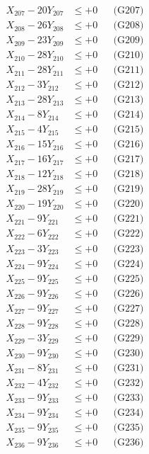 \documentclass[a4paper,10pt]{article}
\begin{document}
{\begin{align}
X_{207} - 20Y_{207} &\leq +0 && \text{(G207)} \\
X_{208} - 26Y_{208} &\leq +0 && \text{(G208)} \\
X_{209} - 23Y_{209} &\leq +0 && \text{(G209)} \\
X_{210} - 28Y_{210} &\leq +0 && \text{(G210)} \\
X_{211} - 28Y_{211} &\leq +0 && \text{(G211)} \\
X_{212} - 3Y_{212} &\leq +0 && \text{(G212)} \\
X_{213} - 28Y_{213} &\leq +0 && \text{(G213)} \\
X_{214} - 8Y_{214} &\leq +0 && \text{(G214)} \\
X_{215} - 4Y_{215} &\leq +0 && \text{(G215)} \\
\allowbreak
X_{216} - 15Y_{216} &\leq +0 && \text{(G216)} \\
X_{217} - 16Y_{217} &\leq +0 && \text{(G217)} \\
X_{218} - 12Y_{218} &\leq +0 && \text{(G218)} \\
X_{219} - 28Y_{219} &\leq +0 && \text{(G219)} \\
X_{220} - 19Y_{220} &\leq +0 && \text{(G220)} \\
X_{221} - 9Y_{221} &\leq +0 && \text{(G221)} \\
X_{222} - 6Y_{222} &\leq +0 && \text{(G222)} \\
X_{223} - 3Y_{223} &\leq +0 && \text{(G223)} \\
X_{224} - 9Y_{224} &\leq +0 && \text{(G224)} \\
X_{225} - 9Y_{225} &\leq +0 && \text{(G225)} \\
\allowbreak
X_{226} - 9Y_{226} &\leq +0 && \text{(G226)} \\
X_{227} - 9Y_{227} &\leq +0 && \text{(G227)} \\
X_{228} - 9Y_{228} &\leq +0 && \text{(G228)} \\
X_{229} - 3Y_{229} &\leq +0 && \text{(G229)} \\
X_{230} - 9Y_{230} &\leq +0 && \text{(G230)} \\
X_{231} - 8Y_{231} &\leq +0 && \text{(G231)} \\
X_{232} - 4Y_{232} &\leq +0 && \text{(G232)} \\
X_{233} - 9Y_{233} &\leq +0 && \text{(G233)} \\
X_{234} - 9Y_{234} &\leq +0 && \text{(G234)} \\
X_{235} - 9Y_{235} &\leq +0 && \text{(G235)} \\
\allowbreak
X_{236} - 9Y_{236} &\leq +0 && \text{(G236)} \\

\end{align}}
\end{document}
